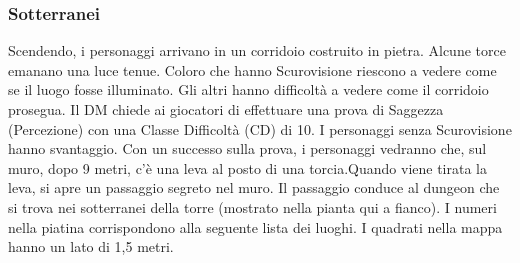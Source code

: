 \documentclass{article}
\begin{document}
\subsubsection{Sotterranei}
Scendendo, i personaggi arrivano in un corridoio costruito in pietra. Alcune torce emanano una luce tenue. Coloro che hanno Scurovisione riescono a vedere come se il luogo fosse illuminato. Gli altri hanno difficoltà a vedere come il corridoio prosegua. Il DM chiede ai giocatori di effettuare una prova di Saggezza (Percezione) con una Classe Difficoltà (CD) di 10. I personaggi senza Scurovisione hanno svantaggio. Con un successo sulla prova, i personaggi vedranno che, sul muro, dopo 9 metri, c'è una leva al posto di una torcia.Quando viene tirata la leva, si apre un passaggio segreto nel muro. Il passaggio conduce al dungeon che si trova nei sotterranei della torre (mostrato nella pianta qui a fianco). I numeri nella piatina corrispondono alla seguente lista dei luoghi. I quadrati nella mappa hanno un lato di 1,5 metri.
\end{document}
